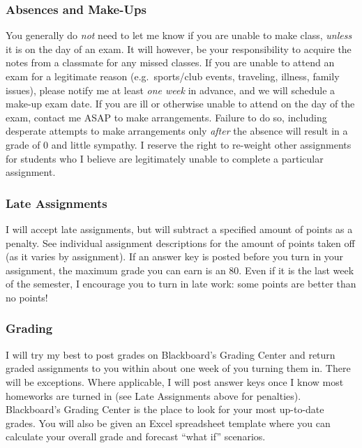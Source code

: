 \documentclass{article}
\begin{document}
\hypertarget{absences-and-make-ups}{%
\subsubsection{Absences and Make-Ups}\label{absences-and-make-ups}}

You generally do \emph{not} need to let me know if you are unable to
make class, \emph{unless} it is on the day of an exam. It will however,
be your responsibility to acquire the notes from a classmate for any
missed classes. If you are unable to attend an exam for a legitimate
reason (e.g.~sports/club events, traveling, illness, family issues),
please notify me at least \emph{one week} in advance, and we will
schedule a make-up exam date. If you are ill or otherwise unable to
attend on the day of the exam, contact me ASAP to make arrangements.
Failure to do so, including desperate attempts to make arrangements only
\emph{after} the absence will result in a grade of 0 and little
sympathy. I reserve the right to re-weight other assignments for
students who I believe are legitimately unable to complete a particular
assignment.

\hypertarget{late-assignments}{%
\subsubsection{Late Assignments}\label{late-assignments}}

I will accept late assignments, but will subtract a specified amount of
points as a penalty. See individual assignment descriptions for the
amount of points taken off (as it varies by assignment). If an answer
key is posted before you turn in your assignment, the maximum grade you
can earn is an 80. Even if it is the last week of the semester, I
encourage you to turn in late work: some points are better than no
points!

\hypertarget{grading}{%
\subsubsection{Grading}\label{grading}}

I will try my best to post grades on Blackboard's Grading Center and
return graded assignments to you within about one week of you turning
them in. There will be exceptions. Where applicable, I will post answer
keys once I know most homeworks are turned in (see Late Assignments
above for penalties). Blackboard's Grading Center is the place to look
for your most up-to-date grades. You will also be given an Excel
spreadsheet template where you can calculate your overall grade and
forecast ``what if'' scenarios.
\end{document}
